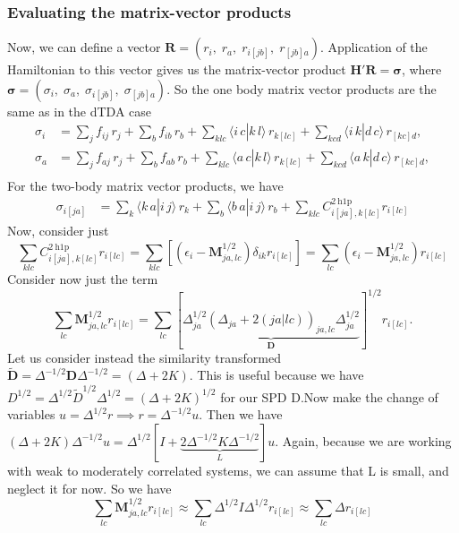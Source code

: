 \subsubsection{Evaluating the matrix-vector products}
Now, we can define a vector $\bm{R} = ( r_i,\; r_a,\; r_{i[jb]},\; r_{[jb]a} )$. Application of the Hamiltonian to this vector gives us the matrix-vector product $\bm{H'} \bm{R} = \bm{\sigma }$, where $\bm{\sigma} = ( \sigma_i,\; \sigma_a,\; \sigma_{i[jb]},\; \sigma_{[jb]a} )$. So the one body matrix vector products are the same as in the dTDA case
\begin{align}
\sigma_i &= 
  \sum_{j} f_{i j}\,r_j
  + \sum_{b} f_{i b}\,r_b
  + \sum_{k l c} \bigl\langle i\,c | k\,l \bigr\rangle\,r_{k[l c]}
  + \sum_{k c d} \bigl\langle i\,k | d\,c \bigr\rangle\,r_{[k c]d}, \\[6pt]
\sigma_a &=
    \sum_{j} f_{a j}\,r_j
    + \sum_{b} f_{a b}\,r_b
    + \sum_{k l c} \bigl\langle a\,c | k\,l \bigr\rangle\,r_{k[l c]}
    + \sum_{k c d} \bigl\langle a\,k | d\,c \bigr\rangle\,r_{[k c]d}, \\[6pt]
\end{align}
For the two-body matrix vector products, we have
\begin{align}
\sigma_{i[ja]} &=
    \sum_{k} \bigl\langle k\,a | i\,j \bigr\rangle\,r_k
    + \sum_{b} \bigl\langle b\,a | i\,j \bigr\rangle\,r_b
    + \sum_{klc} C_{i[j a], k[l c]}^{2 \mathrm{~h} 1 \mathrm{p}} r_{i[l c]}
\end{align}
Now, consider just
\begin{equation}
    \sum_{klc} C_{i[j a], k[l c]}^{2 \mathrm{~h} 1 \mathrm{p}} r_{i[l c]}= \sum_{klc} \left[\left(\epsilon_i-{\bm{M}}^{1/2}_{ja,lc}\right) \delta_{ik} r_{i[l c]} \right] = \sum_{l c} \left(\epsilon_i - {\bm{M}}^{1/2}_{ja,lc}\right) r_{i[l c]}
\end{equation}
Consider now just the term 
\begin{equation}
    \sum_{l c} {\bm{M}}^{1/2}_{ja,lc} r_{i[l c]} =  \sum_{l c} \left[\underbrace{\Delta _{ja}^{1/2} \left(\Delta_{ja} + 2(ja|lc)\right)_{ja,lc} \Delta_{ja}^{1/2}}_{\bm{D}}\right]^{1/2} r_{i[l c]}.
\end{equation}
Let us consider instead the similarity transformed $\tilde{\bm{D}} = \Delta^{-1/2} \bm{D} \Delta^{-1/2} = \left(\Delta + 2K\right)$. This is useful because we have $D^{1/2} = \Delta^{1/2}\tilde{D}^{1/2}\Delta^{1/2}=\left(\Delta+2K\right)^{1/2}$ for our SPD D.Now make the change of variables $u = \Delta^{1/2}r \implies r = \Delta^{-1/2}u$. Then we have $\left(\Delta + 2K\right) \Delta^{-1/2}u = \Delta^{1/2} \left[ {I} + \underbrace{2\Delta^{-1/2}K\Delta^{-1/2}}_{L}\right] u$. Again, because we are working with weak to moderately correlated systems, we can assume that L is small, and neglect it for now. So we have
\begin{equation}
    \sum_{l c} {\bm{M}}^{1/2}_{ja,lc} r_{i[l c]} \approx \sum_{l c} \Delta^{1/2} I \Delta^{1/2} r_{i[l c]} \approx \sum_{l c} \Delta r_{i[l c]}
\end{equation}

